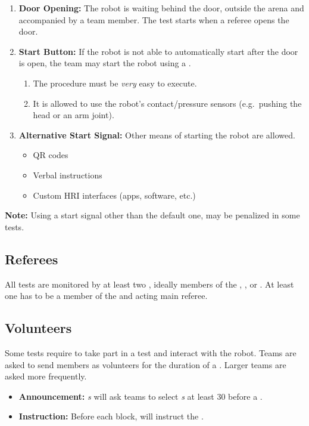 \begin{enumerate}
	\item \textbf{Door Opening:} The robot is waiting behind the door, outside the arena and accompanied by a team member.
	The test starts when a referee opens the door.

	\item \textbf{Start Button:} If the robot is not able to automatically start after the door is open, the team may start the robot using a \StartButton{}.
	\begin{enumerate}[nosep]
		\item The procedure must be \emph{very} easy to execute.
		\item It is allowed to use the robot's contact/pressure sensors (e.g.~pushing the head or an arm joint).
	\end{enumerate}

	\item \textbf{Alternative Start Signal:} Other means of starting the robot are allowed.
	\begin{itemize}[nosep]
		\item QR codes
		\item Verbal instructions
		\item Custom HRI interfaces (apps, software, etc.)
	\end{itemize}
\end{enumerate}
\noindent\textbf{Note:} Using a start signal other than the default one, may be penalized in some tests.


\subsection{Referees}
\label{sec:rules:referees}
All tests are monitored by at least two \Referees{}, ideally members of the , , or . At least one has to be a member of the  and acting main referee.


\subsection{Volunteers}
\label{sec:rules:volunteers}
Some tests require \Volunteers{} to take part in a test and interact with the robot. Teams are asked to send members as volunteers for the duration of a \Testblock{}. Larger teams are asked more frequently. 
\begin{itemize}
	\item \textbf{Announcement:} \Referee\textit{s} will ask teams to select \Volunteer\textit{s} at least \SI{30}{\min} before a \Testblock{}.
	\item \textbf{Instruction:} Before each block, \Referees{} will instruct the \Volunteers{}.
\end{itemize}


